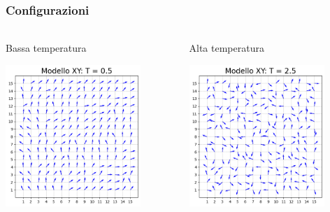 \begin{frame}
    \frametitle{Configurazioni}
    \framesubtitle{}

    \begin{columns}
        \begin{column}{0.5\textwidth}
            \begin{block}{Bassa temperatura}

            \centering
            \includegraphics[width=0.8\textwidth]{Immagini/simXY/conf_T0.5.png}

            \end{block}
        \end{column}
    
        \begin{column}{0.5\textwidth}
            \begin{block}{Alta temperatura}

                \centering
                \includegraphics[width=0.8\textwidth]{Immagini/simXY/conf_T2.5.png}


\end{block}
\end{column}
\end{columns}
\end{frame}
